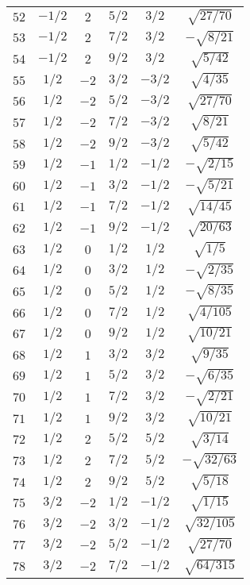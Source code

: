 \begin{table}
\begin{center}
\begin{tabular}{|c|c|c|c|c|c|}
$52$ & $-1/2$ & $2$ & $5/2$ & $3/2$ & $\sqrt{27/70}$ \\ 
$53$ & $-1/2$ & $2$ & $7/2$ & $3/2$ & $-\sqrt{8/21}$ \\ 
$54$ & $-1/2$ & $2$ & $9/2$ & $3/2$ & $\sqrt{5/42}$ \\ 
$55$ & $1/2$ & $-2$ & $3/2$ & $-3/2$ & $\sqrt{4/35}$ \\ 
$56$ & $1/2$ & $-2$ & $5/2$ & $-3/2$ & $\sqrt{27/70}$ \\ 
$57$ & $1/2$ & $-2$ & $7/2$ & $-3/2$ & $\sqrt{8/21}$ \\ 
$58$ & $1/2$ & $-2$ & $9/2$ & $-3/2$ & $\sqrt{5/42}$ \\ 
$59$ & $1/2$ & $-1$ & $1/2$ & $-1/2$ & $-\sqrt{2/15}$ \\ 
$60$ & $1/2$ & $-1$ & $3/2$ & $-1/2$ & $-\sqrt{5/21}$ \\ 
$61$ & $1/2$ & $-1$ & $7/2$ & $-1/2$ & $\sqrt{14/45}$ \\ 
$62$ & $1/2$ & $-1$ & $9/2$ & $-1/2$ & $\sqrt{20/63}$ \\ 
$63$ & $1/2$ & $0$ & $1/2$ & $1/2$ & $\sqrt{1/5}$ \\ 
$64$ & $1/2$ & $0$ & $3/2$ & $1/2$ & $-\sqrt{2/35}$ \\ 
$65$ & $1/2$ & $0$ & $5/2$ & $1/2$ & $-\sqrt{8/35}$ \\ 
$66$ & $1/2$ & $0$ & $7/2$ & $1/2$ & $\sqrt{4/105}$ \\ 
$67$ & $1/2$ & $0$ & $9/2$ & $1/2$ & $\sqrt{10/21}$ \\ 
$68$ & $1/2$ & $1$ & $3/2$ & $3/2$ & $\sqrt{9/35}$ \\ 
$69$ & $1/2$ & $1$ & $5/2$ & $3/2$ & $-\sqrt{6/35}$ \\ 
$70$ & $1/2$ & $1$ & $7/2$ & $3/2$ & $-\sqrt{2/21}$ \\ 
$71$ & $1/2$ & $1$ & $9/2$ & $3/2$ & $\sqrt{10/21}$ \\ 
$72$ & $1/2$ & $2$ & $5/2$ & $5/2$ & $\sqrt{3/14}$ \\ 
$73$ & $1/2$ & $2$ & $7/2$ & $5/2$ & $-\sqrt{32/63}$ \\ 
$74$ & $1/2$ & $2$ & $9/2$ & $5/2$ & $\sqrt{5/18}$ \\ 
$75$ & $3/2$ & $-2$ & $1/2$ & $-1/2$ & $\sqrt{1/15}$ \\ 
$76$ & $3/2$ & $-2$ & $3/2$ & $-1/2$ & $\sqrt{32/105}$ \\ 
$77$ & $3/2$ & $-2$ & $5/2$ & $-1/2$ & $\sqrt{27/70}$ \\ 
$78$ & $3/2$ & $-2$ & $7/2$ & $-1/2$ & $\sqrt{64/315}$ \\ 

\end{tabular}
\end{center}
\end{table}
